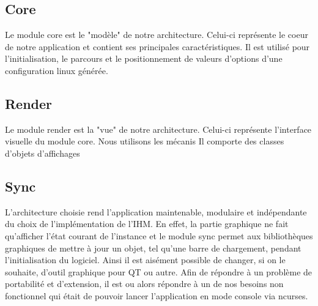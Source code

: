 \documentclass[16pts]{report}
\begin{document}
    \subsection{Core}
    \label{sub:Core}
    Le module core est le "modèle" de notre architecture.
    Celui-ci représente le coeur de notre application et contient
    ses principales caractéristiques.
    Il est utilisé pour l'initialisation, le parcours et le positionnement
    de valeurs d'options d'une configuration linux générée.

    \subsection{Render}
    \label{sub:Render}
    Le module render est la "vue" de notre architecture.
    Celui-ci représente l'interface visuelle du module core. Nous utilisons
    les mécanis
    Il comporte des classes d'objets d'affichages

    \subsection{Sync}
    \label{sub:Sync}
    L'architecture choisie rend l'application maintenable, modulaire et
    indépendante du choix de l'implémentation de l'IHM. En effet, la partie
    graphique ne fait qu'afficher l'état courant de l'instance et le module
    sync permet aux bibliothèques graphiques de mettre à jour un objet, tel
    qu'une barre de chargement, pendant l'initialisation du logiciel.
    Ainsi il est aisément possible de changer, si on le souhaite, d'outil
    graphique pour QT ou autre.
    Afin de répondre à un problème de portabilité et d'extension, il est
    ou alors répondre à un de nos besoins non fonctionnel qui était de pouvoir
    lancer l'application en mode console via ncurses.
\end{document}
